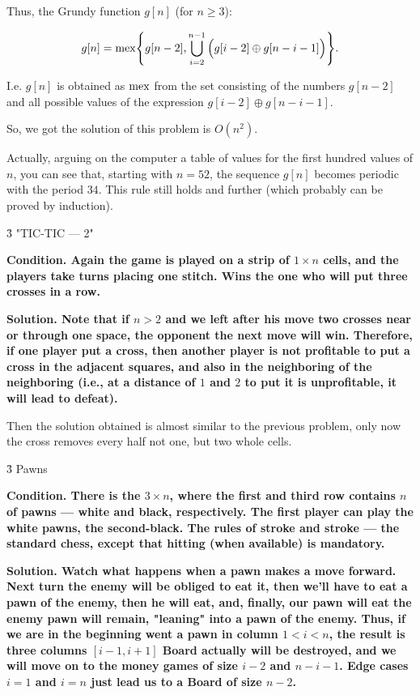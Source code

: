 Thus, the Grundy function $g[n]$ (for $n \ge 3$):

$$ g[n] = {\rm mex} \Bigg\{ g[n-2], \bigcup_{i=2}^{n-1} \Big( g[i-2] \oplus g[n-i-1] \Big) \Bigg\}. $$

I.e. $g[n]$ is obtained as $\rm mex$ from the set consisting of the numbers $g[n-2]$ and all possible values of the expression $g[i-2] \oplus g[n-i-1]$.

So, we got the solution of this problem is $O (n^2)$.

Actually, arguing on the computer a table of values for the first hundred values of $n$, you can see that, starting with $n=52$, the sequence $g[n]$ becomes periodic with the period $34$. This rule still holds and further (which probably can be proved by induction).


\h3{ "TIC-TIC --- 2" }

\bf{Condition}. Again the game is played on a strip of $1 \times n$ cells, and the players take turns placing one stitch. Wins the one who will put three crosses in a row.

\bf{Solution}. Note that if $n>2$ and we left after his move two crosses near or through one space, the opponent the next move will win. Therefore, if one player put a cross, then another player is not profitable to put a cross in the adjacent squares, and also in the neighboring of the neighboring (i.e., at a distance of $1$ and $2$ to put it is unprofitable, it will lead to defeat).

Then the solution obtained is almost similar to the previous problem, only now the cross removes every half not one, but two whole cells.


\h3 {Pawns }

\bf{Condition}. There is the $3 \times n$, where the first and third row contains $n$ of pawns --- white and black, respectively. The first player can play the white pawns, the second-black. The rules of stroke and stroke --- the standard chess, except that hitting (when available) is mandatory.

\bf{Solution}. Watch what happens when a pawn makes a move forward. Next turn the enemy will be obliged to eat it, then we'll have to eat a pawn of the enemy, then he will eat, and, finally, our pawn will eat the enemy pawn will remain, "leaning" into a pawn of the enemy. Thus, if we are in the beginning went a pawn in column $1 < i < n$, the result is three columns $[i-1, i+1]$ Board actually will be destroyed, and we will move on to the money games of size $i-2$ and $n - i - 1$. Edge cases $i=1$ and $i=n$ just lead us to a Board of size $n-2$.

